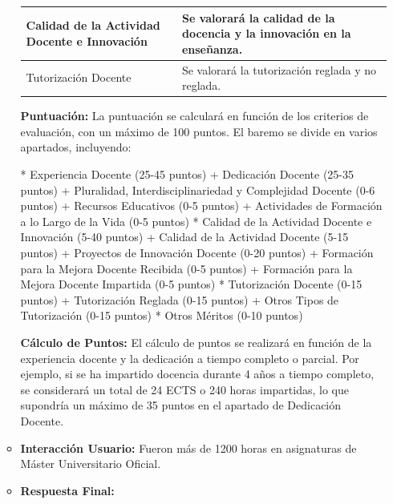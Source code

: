 \documentclass{article}
\begin{document}
\begin{itemize}
\begin{itemize}
\begin{table}[h!]
\begin{tabular}{|p{}|p{}|}
                    Calidad de la Actividad Docente e Innovación            & Se valorará la calidad de la docencia y la innovación en la enseñanza.                                                                                               \\\hline
                    Tutorización Docente                                    & Se valorará la tutorización reglada y no reglada.                                                                                                                    \\\hline
                  \end{tabular}\end{table}
                \vspace{0.4cm}

                \textbf{Puntuación:}
                La puntuación se calculará en función de los criterios de evaluación, con un máximo de 100 puntos. El baremo se divide en varios apartados, incluyendo:

                * Experiencia Docente (25-45 puntos)
                + Dedicación Docente (25-35 puntos)
                + Pluralidad, Interdisciplinariedad y Complejidad Docente (0-6 puntos)
                + Recursos Educativos (0-5 puntos)
                + Actividades de Formación a lo Largo de la Vida (0-5 puntos)
                * Calidad de la Actividad Docente e Innovación (5-40 puntos)
                + Calidad de la Actividad Docente (5-15 puntos)
                + Proyectos de Innovación Docente (0-20 puntos)
                + Formación para la Mejora Docente Recibida (0-5 puntos)
                + Formación para la Mejora Docente Impartida (0-5 puntos)
                * Tutorización Docente (0-15 puntos)
                + Tutorización Reglada (0-15 puntos)
                + Otros Tipos de Tutorización (0-15 puntos)
                * Otros Méritos (0-10 puntos)

                \textbf{Cálculo de Puntos:}
                El cálculo de puntos se realizará en función de la experiencia docente y la dedicación a tiempo completo o parcial. Por ejemplo, si se ha impartido docencia durante 4 años a tiempo completo, se considerará un total de 24 ECTS o 240 horas impartidas, lo que supondría un máximo de 35 puntos en el apartado de Dedicación Docente.
          \item \textbf{Interacción Usuario:} Fueron más de 1200 horas en asignaturas de Máster Universitario Oficial.
          \item \textbf{Respuesta Final:}


\end{itemize}
\end{itemize}
\end{document}
